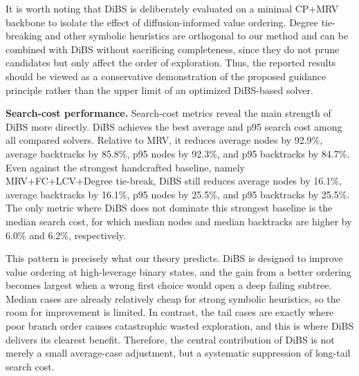 \documentclass[lettersize,journal]{IEEEtran}
\begin{document}
It is worth noting that DiBS is deliberately evaluated on a minimal CP+MRV backbone to isolate the effect of diffusion-informed value ordering.
Degree tie-breaking and other symbolic heuristics are orthogonal to our method and can be combined with DiBS without sacrificing completeness, since they do not prune candidates but only affect the order of exploration.
Thus, the reported results should be viewed as a conservative demonstration of the proposed guidance principle rather than the upper limit of an optimized DiBS-based solver.

\textbf{Search-cost performance.} Search-cost metrics reveal the main strength of DiBS more directly.
DiBS achieves the best average and p95 search cost among all compared solvers.
Relative to MRV, it reduces average nodes by 92.9\%, average backtracks by 85.8\%, p95 nodes by 92.3\%, and p95 backtracks by 84.7\%.
Even against the strongest handcrafted baseline, namely MRV+FC+LCV+Degree tie-break, DiBS still reduces average nodes by 16.1\%, average backtracks by 16.1\%, p95 nodes by 25.5\%, and p95 backtracks by 25.5\%.
The only metric where DiBS does not dominate this strongest baseline is the median search cost, for which median nodes and median backtracks are higher by 6.0\% and 6.2\%, respectively.

This pattern is precisely what our theory predicts.
DiBS is designed to improve value ordering at high-leverage binary states, and the gain from a better ordering becomes largest when a wrong first choice would open a deep failing subtree.
Median cases are already relatively cheap for strong symbolic heuristics, so the room for improvement is limited.
In contrast, the tail cases are exactly where poor branch order causes catastrophic wasted exploration, and this is where DiBS delivers its clearest benefit.
Therefore, the central contribution of DiBS is not merely a small average-case adjustment, but a systematic suppression of long-tail search cost.
\end{document}

